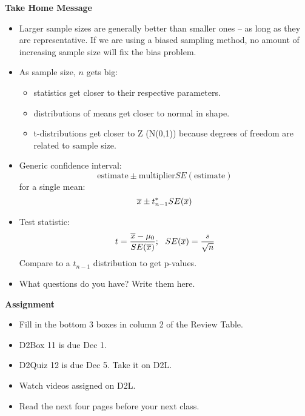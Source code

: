 \begin{center}
  {\large\bf Take Home Message}
\end{center}
 
\begin{itemize}
\item Larger sample sizes are generally better than smaller ones --
   as long as they are representative.  If we are using a biased
   sampling method, no amount of increasing sample size will fix the
   bias problem.
 \item As sample size, $n$ gets big:
   \begin{itemize}
   \item statistics get closer to their respective parameters.
   \item distributions of means get closer to normal in shape.
   \item t-distributions get closer to Z (N(0,1)) because degrees of
     freedom are related to sample size.
   \end{itemize}
 \item Generic confidence interval:
  $$ \mbox{estimate} \pm \mbox{multiplier} SE(\mbox{estimate})$$
    for a single mean:
  $$ \overline{x} \pm t^*_{n-1} SE(\overline{x})$$
  \item Test statistic:
   $$ t = \frac{\overline{x} - \mu_0}{SE(\overline{x})};\ \ SE(\overline{x}) =
   \frac{s}{\sqrt{n}}$$
    Compare to a $t_{n-1}$ distribution to get p-values.

 \item What questions do you have?  Write them here.\vfill

\end{itemize}




\begin{center}
  {\large\bf Assignment}
\end{center}

\begin{itemize}
\item Fill in the bottom 3 boxes in column 2 of the Review Table. 
\item D2Box 11 is due Dec 1. 
\item D2Quiz 12 is due Dec 5.  Take it on D2L.
\item Watch videos assigned on D2L.
\item Read the next four pages before your next class.
\end{itemize}
